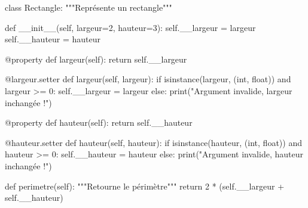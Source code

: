 \documentclass[
  letterpaper,
  DIV=11,
  numbers=noendperiod]{scrartcl}
\newenvironment{Shaded}{\begin{snugshade}}{\end{snugshade}}
\newcommand{\AttributeTok}[1]{\textcolor[rgb]{0.40,0.45,0.13}{#1}}
\newcommand{\BuiltInTok}[1]{\textcolor[rgb]{0.00,0.23,0.31}{#1}}
\newcommand{\CommentTok}[1]{\textcolor[rgb]{0.37,0.37,0.37}{#1}}
\newcommand{\ControlFlowTok}[1]{\textcolor[rgb]{0.00,0.23,0.31}{#1}}
\newcommand{\DecValTok}[1]{\textcolor[rgb]{0.68,0.00,0.00}{#1}}
\newcommand{\FunctionTok}[1]{\textcolor[rgb]{0.28,0.35,0.67}{#1}}
\newcommand{\KeywordTok}[1]{\textcolor[rgb]{0.00,0.23,0.31}{#1}}
\newcommand{\NormalTok}[1]{\textcolor[rgb]{0.00,0.23,0.31}{#1}}
\newcommand{\OperatorTok}[1]{\textcolor[rgb]{0.37,0.37,0.37}{#1}}
\newcommand{\StringTok}[1]{\textcolor[rgb]{0.13,0.47,0.30}{#1}}
\newcommand{\VariableTok}[1]{\textcolor[rgb]{0.07,0.07,0.07}{#1}}
\begin{document}
\begin{Shaded}
\begin{Highlighting}[]
\KeywordTok{class}\NormalTok{ Rectangle:}
    \CommentTok{"""Représente un rectangle"""}

    \KeywordTok{def} \FunctionTok{\_\_init\_\_}\NormalTok{(}\VariableTok{self}\NormalTok{, largeur}\OperatorTok{=}\DecValTok{2}\NormalTok{, hauteur}\OperatorTok{=}\DecValTok{3}\NormalTok{):}
        \VariableTok{self}\NormalTok{.\_\_largeur }\OperatorTok{=}\NormalTok{ largeur}
        \VariableTok{self}\NormalTok{.\_\_hauteur }\OperatorTok{=}\NormalTok{ hauteur}

    \AttributeTok{@property}
    \KeywordTok{def}\NormalTok{ largeur(}\VariableTok{self}\NormalTok{):}
        \ControlFlowTok{return} \VariableTok{self}\NormalTok{.\_\_largeur}

    \AttributeTok{@largeur.setter}
    \KeywordTok{def}\NormalTok{ largeur(}\VariableTok{self}\NormalTok{, largeur):}
        \ControlFlowTok{if} \BuiltInTok{isinstance}\NormalTok{(largeur, (}\BuiltInTok{int}\NormalTok{, }\BuiltInTok{float}\NormalTok{)) }\KeywordTok{and}\NormalTok{ largeur }\OperatorTok{\textgreater{}=} \DecValTok{0}\NormalTok{:}
            \VariableTok{self}\NormalTok{.\_\_largeur }\OperatorTok{=}\NormalTok{ largeur}
        \ControlFlowTok{else}\NormalTok{:}
            \BuiltInTok{print}\NormalTok{(}\StringTok{"Argument invalide, largeur inchangée !"}\NormalTok{)}

    \AttributeTok{@property}
    \KeywordTok{def}\NormalTok{ hauteur(}\VariableTok{self}\NormalTok{):}
        \ControlFlowTok{return} \VariableTok{self}\NormalTok{.\_\_hauteur}

    \AttributeTok{@hauteur.setter}
    \KeywordTok{def}\NormalTok{ hauteur(}\VariableTok{self}\NormalTok{, hauteur):}
        \ControlFlowTok{if} \BuiltInTok{isinstance}\NormalTok{(hauteur, (}\BuiltInTok{int}\NormalTok{, }\BuiltInTok{float}\NormalTok{)) }\KeywordTok{and}\NormalTok{ hauteur }\OperatorTok{\textgreater{}=} \DecValTok{0}\NormalTok{:}
            \VariableTok{self}\NormalTok{.\_\_hauteur }\OperatorTok{=}\NormalTok{ hauteur}
        \ControlFlowTok{else}\NormalTok{:}
            \BuiltInTok{print}\NormalTok{(}\StringTok{"Argument invalide, hauteur inchangée !"}\NormalTok{)}

    \KeywordTok{def}\NormalTok{ perimetre(}\VariableTok{self}\NormalTok{):}
        \CommentTok{"""Retourne le périmètre"""}
        \ControlFlowTok{return} \DecValTok{2} \OperatorTok{*}\NormalTok{ (}\VariableTok{self}\NormalTok{.\_\_largeur }\OperatorTok{+} \VariableTok{self}\NormalTok{.\_\_hauteur)}


\end{Highlighting}
\end{Shaded}
\end{document}

